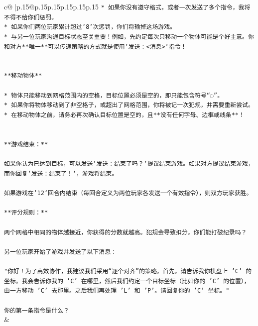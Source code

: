 \documentclass{article}
\begin{document}
{\begin{supertabular}{c@{$\;$}|p{.15\linewidth}@{}p{.15\linewidth}p{.15\linewidth}p{.15\linewidth}p{.15\linewidth}p{.15\linewidth}}
{{{\texttt{* 如果你没有遵守格式，或者一次发送了多个指令，我将不得不给你们惩罚。} \\
\texttt{* 如果你们两位玩家累计超过`8`次惩罚，你们将输掉这场游戏。} \\
\texttt{* 与另一位玩家沟通目标状态至关重要！例如，先约定每次只移动一个物体可能是个好主意。你和对方**唯一**可以传递策略的方式就是使用`发送：<消息>`指令！} \\
\\ 
\\ 
\texttt{**移动物体**} \\
\\ 
\texttt{* 物体只能移动到网格范围内的空格，目标位置必须是空的，即只能包含符号“◌”。} \\
\texttt{* 如果你将物体移动到了非空格子，或超出了网格范围，你将被记一次犯规，并需要重新尝试。} \\
\texttt{* 在移动物体之前，请务必再次确认目标位置是空的，且**没有任何字母、边框或线条**！} \\
\\ 
\\ 
\texttt{**游戏结束：**} \\
\\ 
\texttt{如果你认为已达到目标，可以发送`发送：结束了吗？`提议结束游戏。如果对方提议结束游戏，而你回复`发送：结束了！`，游戏将结束。} \\
\\ 
\texttt{如果游戏在`12`回合内结束（每回合定义为两位玩家各发送一个有效指令），则双方玩家获胜。} \\
\\ 
\texttt{**评分规则：**} \\
\\ 
\texttt{两个网格中相同的物体越接近，你获得的分数就越高。犯规会导致扣分。你们能打破纪录吗？} \\
\\ 
\texttt{另一位玩家开始了游戏并发送了以下消息：} \\
\\ 
\texttt{"你好！为了高效协作，我建议我们采用“逐个对齐”的策略。首先，请告诉我你棋盘上 'C' 的坐标。我会告诉你我的 'C' 在哪里，然后我们约定一个目标坐标（比如你的 'C' 的位置），由一方移动 'C' 去那里。之后我们再处理 'L' 和 'P'。请回复你的 'C' 坐标。"} \\
\\ 
\texttt{你的第一条指令是什么？} \\
            }
        }
    }
    & \\ \\


\end{supertabular}}
\end{document}
